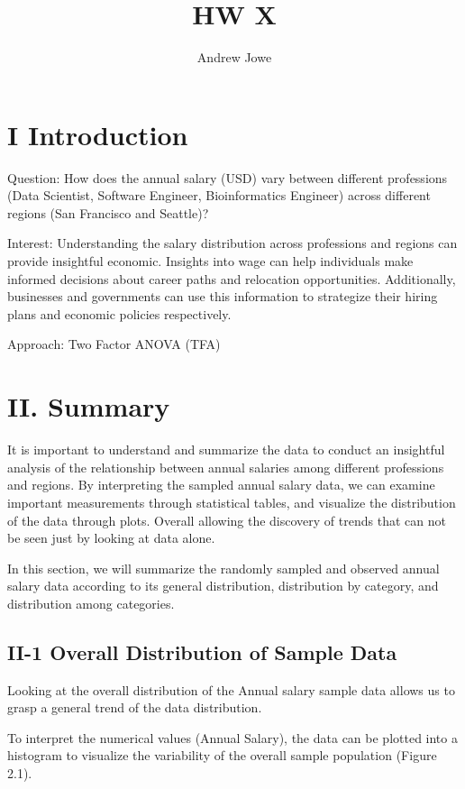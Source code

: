 \documentclass[
]{article}
\title{HW X}
\author{Andrew Jowe}
\date{}
\begin{document}
\maketitle

\section{I Introduction}\label{i-introduction}

Question: How does the annual salary (USD) vary between different
professions (Data Scientist, Software Engineer, Bioinformatics Engineer)
across different regions (San Francisco and Seattle)?

Interest: Understanding the salary distribution across professions and
regions can provide insightful economic. Insights into wage can help
individuals make informed decisions about career paths and relocation
opportunities. Additionally, businesses and governments can use this
information to strategize their hiring plans and economic policies
respectively.

Approach: Two Factor ANOVA (TFA)

\section{II. Summary}\label{ii.-summary}

It is important to understand and summarize the data to conduct an
insightful analysis of the relationship between annual salaries among
different professions and regions. By interpreting the sampled annual
salary data, we can examine important measurements through statistical
tables, and visualize the distribution of the data through plots.
Overall allowing the discovery of trends that can not be seen just by
looking at data alone.

In this section, we will summarize the randomly sampled and observed
annual salary data according to its general distribution, distribution
by category, and distribution among categories.

\subsection{II-1 Overall Distribution of Sample
Data}\label{ii-1-overall-distribution-of-sample-data}

Looking at the overall distribution of the Annual salary sample data
allows us to grasp a general trend of the data distribution.

To interpret the numerical values (Annual Salary), the data can be
plotted into a histogram to visualize the variability of the overall
sample population (Figure 2.1).
\end{document}

